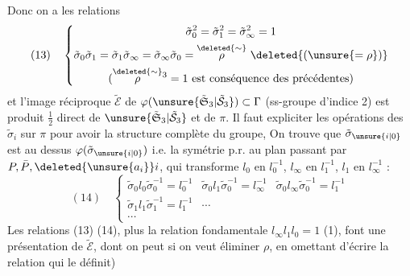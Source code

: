 Donc on a les relations
\[
(13)\quad\left\{\begin{gathered}
\tilde\sigma_0^2=\tilde\sigma_1^2=\tilde\sigma_\infty^2=1\\
\tilde\sigma_0\tilde\sigma_1=\tilde\sigma_1\tilde\sigma_\infty=\tilde\sigma_\infty\tilde\sigma_0
=\overset{\deleted{\sim}}{\rho}\ \deleted{(\unsure{=\rho})}\\
(\overset{\deleted{\sim}}{\rho}{}^3=1\text{ est conséquence des précédentes})
\end{gathered}\right.
\]
et l'image réciproque $\tilde{\mathcal E}$ de $\varphi(\unsure{\tilde{\mathfrak S}_3|\tilde{\mathcal S}_3})\subset\Gamma$ (ss-groupe d'indice 2) est produit $\frac12$ direct de $\unsure{\tilde{\mathfrak S}_3|\tilde{\mathcal S}_3}$ et de $\pi$. Il faut expliciter les opérations des $\tilde\sigma_i$ sur $\pi$ pour avoir la structure complète du groupe, On trouve que $\tilde\sigma_{\unsure{i|0}}$ est au dessus $\varphi(\tilde\sigma_{\unsure{i|0}})$ i.e. la symétrie p.r. au plan passant par $P,\bar P,\deleted{\unsure{a_i}}i$, qui transforme $l_0$ en $l_0^{-1}$, $l_\infty$ en $l_1^{-1}$, $l_1$ en $l_\infty^{-1}$ :
\[
(14)\quad\left\{\begin{array}{lll}
\tilde\sigma_0l_0\tilde\sigma_0^{-1}=l_0^{-1}&
\tilde\sigma_0l_1\tilde\sigma_0^{-1}=l_\infty^{-1}&
\tilde\sigma_0l_\infty\tilde\sigma_0^{-1}=l_1^{-1}\\
\tilde\sigma_1l_1\tilde\sigma_1^{-1}=l_1^{-1}&\cdots&\\
\cdots&&
\end{array}\right.
\]
Les relations (13) (14), plus la relation fondamentale $l_\infty l_1l_0=1$ (1), font une présentation de $\tilde{\mathcal E}$, dont on peut si on veut éliminer $\rho$, \unsure{(}en omettant d'écrire la relation qui le définit)

